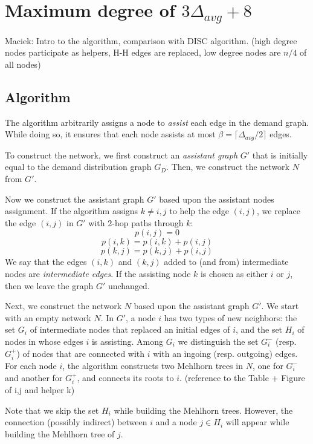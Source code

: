 \documentclass{article}
\begin{document}
\section{Maximum degree of $3\Delta_{avg} + 8$}

Maciek: Intro to the algorithm, comparison with DISC algorithm.
(high degree nodes participate as helpers, H-H edges are replaced, low degree nodes are $n/4$ of all nodes)

\subsection{Algorithm}


The algorithm arbitrarily assigns a node to \emph{assist} each edge in the demand graph.
While doing so, it ensures that each node assists at most $\beta = \lceil\Delta_{avg}/2\rceil$ edges.


To construct the network, we first construct an \emph{assistant graph} $G'$ that is initially equal to the demand distribution graph $G_D$.
Then, we construct the network $N$ from $G'$.

Now we construct the assistant graph $G'$ based upon the assistant nodes assignment.
If the algorithm assigns $k \neq i,j$ to help the edge $(i, j)$, we replace the edge $(i, j)$ in $G'$ with 
2-hop paths through $k$:
$$ p(i,j) = 0$$
$$ p(i,k) = p(i,k) + p(i,j)$$
$$ p(k,j) = p(k,j) + p(i,j)$$
We say that the edges $(i,k)$ and $(k,j)$ added to (and from) intermediate nodes are \emph{intermediate edges}.
If the assisting node $k$ is chosen as either $i$ or $j$, then we leave the graph $G'$ unchanged.

Next, we construct the network $N$ based upon the assistant graph $G'$.
We start with an empty network $N$.
In $G'$, a node $i$ has two types of new neighbors: 
the set $G_i$ of intermediate nodes that replaced an initial edges of $i$, and the set $H_i$ of nodes in whose edges $i$ is assisting.
Among $G_i$ we distinguish the set $G_i^-$ (resp. $G_i^+$) of nodes that are connected with $i$ with an ingoing (resp. outgoing) edges.
For each node $i$, the algorithm constructs two Mehlhorn trees in $N$, one for $G_i^-$ and another for $G_i^+$, and connects its roots to $i$.
(reference to the Table + Figure of i,j and helper k)

Note that we skip the set $H_i$ while building the Mehlhorn trees.
However, the connection (possibly indirect) between $i$ and a node $j \in H_i$ will appear while building the Mehlhorn tree of $j$.
\end{document}
